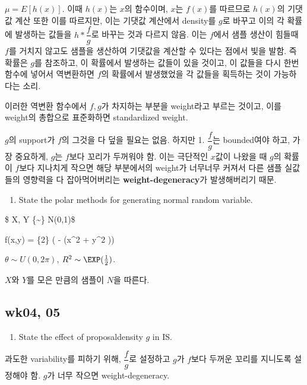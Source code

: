 \documentclass[
]{book}
\providecommand{\tightlist}{%
  \setlength{\itemsep}{0pt}\setlength{\parskip}{0pt}}
\begin{document}
\(\mu = E[h(x)]\). 이때 \(h(x)\)는 \(x\)의 함수이며, \(x\)는 \(f(x)\)를 따르므로 \(h(x)\)의 기댓값 계산 또한 이를 따르지만, 이는 기댓값 계산에서 density를 \(g\)로 바꾸고 이의 각 확률에 발생하는 값들을 \(h \ast \dfrac{f}{g}\)로 바꾸는 것과 다르지 않음. 이는 \(f\)에서 샘플 생산이 힘들때 \(f\)를 거치지 않고도 샘플을 생산하여 기댓값을 계산할 수 있다는 점에서 빛을 발함. 즉 확률은 \(g\)를 참조하고, 이 확률에서 발생하는 값들이 있을 것이고, 이 값들을 다시 한번 함수에 넣어서 역변환하면 \(f\)의 확률에서 발생했었을 각 값들을 획득하는 것이 가능하다는 소리.

이러한 역변환 함수에서 \(f, g\)가 차지하는 부분을 weight라고 부르는 것이고, 이를 weight의 총합으로 표준화하면 standardized weight.

\(g\)의 support가 \(f\)의 그것을 다 덮을 필요는 없음. 하지만 1. \(\dfrac{f}{g}\)는 bounded여야 하고, 가장 중요하게, \(g\)는 \(f\)보다 꼬리가 두꺼워야 함. 이는 극단적인 \(x\)값이 나왔을 때 \(g\)의 확률이 \(f\)보다 지나치게 작으면 해당 부분에서의 weight가 너무너무 커져서 다른 샘플 실값들의 영향력을 다 잡아먹어버리는 \textbf{weight-degeneracy}가 발생해버리기 때문.

\begin{enumerate}
\def\labelenumi{\arabic{enumi}.}
\setcounter{enumi}{3}
\tightlist
\item
  State the polar methods for generating normal random variable.
\end{enumerate}

\$ X, Y  \{\sim\} N(0,1)\$

f(x,y) =  \{2\pi\} \exp\left( - (x\^{}2 + y\^{}2 )\right)

\(\theta \sim U(0, 2\pi)\), \(R^2 \sim \EXP (\tfrac{1}{2})\).

\(X\)와 \(Y\)를 모은 만큼의 샘플이 \(N\)을 따른다.

\hypertarget{wk04-05}{%
\subsection{wk04, 05}\label{wk04-05}}

\begin{enumerate}
\def\labelenumi{\arabic{enumi}.}
\tightlist
\item
  State the effect of proposaldensity \(g\) in IS.
\end{enumerate}

과도한 variability를 피하기 위해, \(\dfrac{f}{g}\)로 설정하고 \(g\)가 \(f\)보다 두꺼운 꼬리를 지니도록 설정해야 함. \(g\)가 너무 작으면 weight-degeneracy.
\end{document}
